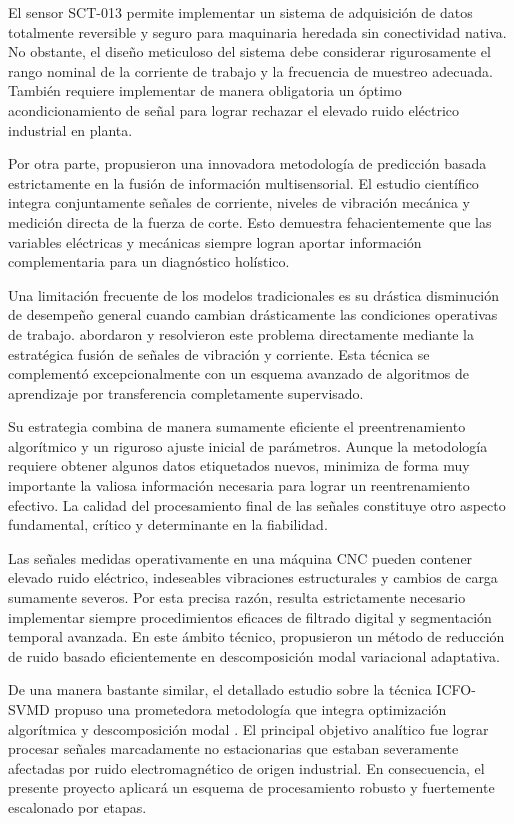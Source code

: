 El sensor SCT-013 permite implementar un sistema de adquisición de datos totalmente reversible y seguro para maquinaria heredada sin conectividad nativa. No obstante, el diseño meticuloso del sistema debe considerar rigurosamente el rango nominal de la corriente de trabajo y la frecuencia de muestreo adecuada. También requiere implementar de manera obligatoria un óptimo acondicionamiento de señal para lograr rechazar el elevado ruido eléctrico industrial en planta.

Por otra parte, \cite{wang2024} propusieron una innovadora metodología de predicción basada estrictamente en la fusión de información multisensorial. El estudio científico integra conjuntamente señales de corriente, niveles de vibración mecánica y medición directa de la fuerza de corte. Esto demuestra fehacientemente que las variables eléctricas y mecánicas siempre logran aportar información complementaria para un diagnóstico holístico.

Una limitación frecuente de los modelos tradicionales es su drástica disminución de desempeño general cuando cambian drásticamente las condiciones operativas de trabajo. \cite{huang2026} abordaron y resolvieron este problema directamente mediante la estratégica fusión de señales de vibración y corriente. Esta técnica se complementó excepcionalmente con un esquema avanzado de algoritmos de aprendizaje por transferencia completamente supervisado.

Su estrategia combina de manera sumamente eficiente el preentrenamiento algorítmico y un riguroso ajuste inicial de parámetros. Aunque la metodología requiere obtener algunos datos etiquetados nuevos, minimiza de forma muy importante la valiosa información necesaria para lograr un reentrenamiento efectivo. La calidad del procesamiento final de las señales constituye otro aspecto fundamental, crítico y determinante en la fiabilidad.

Las señales medidas operativamente en una máquina CNC pueden contener elevado ruido eléctrico, indeseables vibraciones estructurales y cambios de carga sumamente severos. Por esta precisa razón, resulta estrictamente necesario implementar siempre procedimientos eficaces de filtrado digital y segmentación temporal avanzada. En este ámbito técnico, \cite{jia2025} propusieron un método de reducción de ruido basado eficientemente en descomposición modal variacional adaptativa.

De una manera bastante similar, el detallado estudio sobre la técnica ICFO-SVMD propuso una prometedora metodología que integra optimización algorítmica y descomposición modal \citep{icfo2026}. El principal objetivo analítico fue lograr procesar señales marcadamente no estacionarias que estaban severamente afectadas por ruido electromagnético de origen industrial. En consecuencia, el presente proyecto aplicará un esquema de procesamiento robusto y fuertemente escalonado por etapas.

